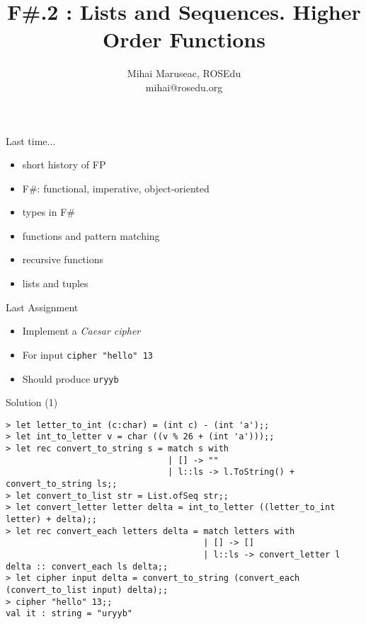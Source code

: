 \documentclass{beamer}
\title{F\#.2 : Lists and Sequences. Higher Order Functions}
\author{Mihai Maruseac, ROSEdu\\mihai@rosedu.org}
\begin{document}
\maketitle

\begin{frame}
  \tableofcontents
\end{frame}

\begin{frame}[fragile]{Last time...}
  \begin{itemize}
    \item short history of FP
    \item F\#: functional, imperative, object-oriented
    \item types in F\#
    \item functions and pattern matching
    \item recursive functions
    \item lists and tuples
  \end{itemize}
\end{frame}

\begin{frame}[fragile]{Last Assignment}
  \begin{itemize}
    \item Implement a \textit{Caesar cipher}
    \item For input \texttt{cipher "hello" 13}
    \item Should produce \texttt{uryyb}
  \end{itemize}
\end{frame}

\begin{frame}[fragile]{Solution (1)}
        \tiny
  \begin{verbatim}
> let letter_to_int (c:char) = (int c) - (int 'a');;
> let int_to_letter v = char ((v % 26 + (int 'a')));;
> let rec convert_to_string s = match s with
                                | [] -> ""
                                | l::ls -> l.ToString() + convert_to_string ls;;
> let convert_to_list str = List.ofSeq str;;
> let convert_letter letter delta = int_to_letter ((letter_to_int letter) + delta);;
> let rec convert_each letters delta = match letters with
                                       | [] -> []
                                       | l::ls -> convert_letter l delta :: convert_each ls delta;;
> let cipher input delta = convert_to_string (convert_each (convert_to_list input) delta);;
> cipher "hello" 13;;
val it : string = "uryyb"
  \end{verbatim}
\end{frame}
\end{document}

